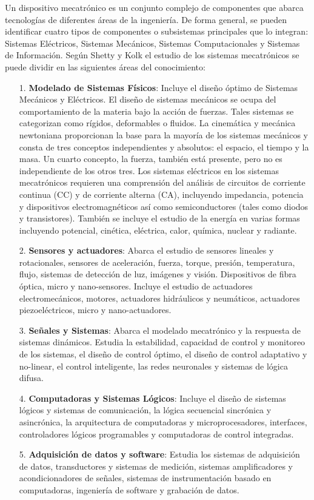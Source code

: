 Un dispositivo mecatrónico es un conjunto complejo de componentes que abarca tecnologías de diferentes áreas de la ingeniería. De forma general, se pueden identificar cuatro tipos de componentes o subsistemas principales que lo integran: Sistemas Eléctricos, Sistemas Mecánicos, Sistemas Computacionales y Sistemas de Información.  Según  Shetty y Kolk \cite{shetty_mechatronics_2010} el estudio de los sistemas mecatrónicos se puede dividir en las siguientes áreas del conocimiento:
	
	\begin{itemize}
	\item[1.]\textbf{Modelado de Sistemas Físicos}: Incluye el diseño óptimo de Sistemas Mecánicos y Eléctricos. El diseño de sistemas mecánicos se ocupa del comportamiento de la materia bajo la acción de fuerzas. Tales sistemas se categorizan como rígidos, deformables o fluidos. La cinemática y mecánica newtoniana proporcionan la base para la mayoría de los sistemas mecánicos y consta de tres conceptos independientes y absolutos: el espacio, el tiempo y la masa. Un cuarto concepto, la fuerza, también está presente, pero no es independiente de los otros tres. Los sistemas eléctricos en los sistemas mecatrónicos requieren una comprensión del análisis de circuitos de corriente continua (CC) y de corriente alterna (CA), incluyendo impedancia, potencia y dispositivos electromagnéticos así como semiconductores (tales como diodos y transistores). También se incluye el estudio de la energía en varias formas incluyendo potencial, cinética, eléctrica, calor, química, nuclear y radiante.
	\item[2.]\textbf{Sensores y actuadores}: Abarca el estudio de sensores lineales y rotacionales, sensores de aceleración, fuerza, torque, presión, temperatura, flujo, sistemas de detección de luz, imágenes y visión. Dispositivos de fibra óptica, micro y nano-sensores. Incluye el estudio de actuadores electromecánicos, motores, actuadores hidráulicos y neumáticos, actuadores piezoeléctricos, micro y nano-actuadores.
	\item[3.]\textbf{Señales y Sistemas}: Abarca el modelado mecatrónico y la respuesta de sistemas dinámicos. Estudia la estabilidad, capacidad de control y monitoreo de los sistemas, el diseño de control óptimo, el diseño de control adaptativo y no-linear, el control inteligente, las redes neuronales y sistemas de lógica difusa.
	\item[4.]\textbf{Computadoras y Sistemas Lógicos}: Incluye el diseño de sistemas lógicos y sistemas de comunicación, la lógica secuencial sincrónica y asincrónica, la arquitectura de computadoras y microprocesadores, interfaces, controladores lógicos programables y computadoras de control integradas.
	\item[5.]\textbf{Adquisición de datos y software}: Estudia los sistemas de adquisición de datos, transductores y sistemas de medición, sistemas amplificadores y acondicionadores de señales, sistemas de instrumentación basado en computadoras, ingeniería de software y grabación de datos.
	
\end{itemize}

